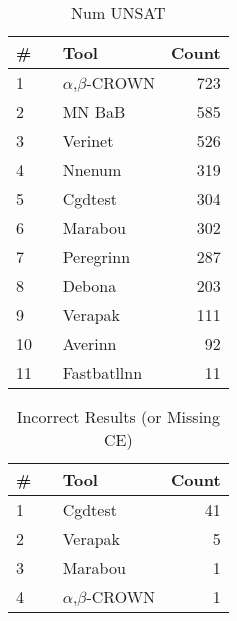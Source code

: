
\begin{table}[h]
\begin{center}
\caption{Num UNSAT} \label{tab:stats3}
{\setlength{\tabcolsep}{2pt}
\begin{tabular}[h]{@{}llr@{}}
\toprule
\textbf{\# ~} & \textbf{Tool} & \textbf{Count}\\
\midrule
1 & $\alpha$,$\beta$-CROWN & 723 \\
2 & MN BaB & 585 \\
3 & Verinet & 526 \\
4 & Nnenum & 319 \\
5 & Cgdtest & 304 \\
6 & Marabou & 302 \\
7 & Peregrinn & 287 \\
8 & Debona & 203 \\
9 & Verapak & 111 \\
10 & Averinn & 92 \\
11 & Fastbatllnn & 11 \\
\bottomrule
\end{tabular}
}
\end{center}
\end{table}




\begin{table}[h]
\begin{center}
\caption{Incorrect Results (or Missing CE)} \label{tab:stats4}
{\setlength{\tabcolsep}{2pt}
\begin{tabular}[h]{@{}llr@{}}
\toprule
\textbf{\# ~} & \textbf{Tool} & \textbf{Count}\\
\midrule
1 & Cgdtest & 41 \\
2 & Verapak & 5 \\
3 & Marabou & 1 \\
4 & $\alpha$,$\beta$-CROWN & 1 \\
\bottomrule
\end{tabular}
}
\end{center}
\end{table}


